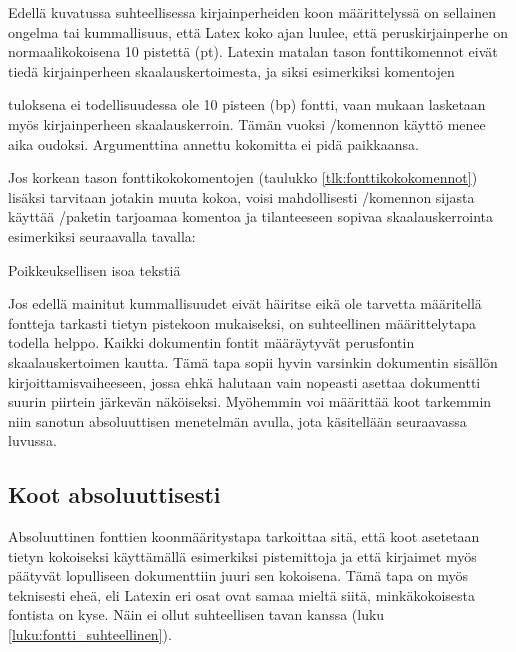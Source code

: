 Edellä kuvatussa suhteellisessa kirjainperheiden koon määrittelyssä on
sellainen ongelma tai kummallisuus, että Latex koko ajan luulee, että
peruskirjainperhe on normaalikokoisena 10 pistettä (pt). Latexin matalan
tason fonttikomennot eivät tiedä kirjainperheen skaalauskertoimesta, ja
siksi esimerkiksi komentojen

\begin{koodilohkosis}
  \fontsize{10bp}{12bp} \selectfont
\end{koodilohkosis}

tuloksena ei todellisuudessa ole 10 pisteen (bp) fontti, vaan mukaan
lasketaan myös kirjainperheen skaalauskerroin. Tämän vuoksi \-/komennon käyttö menee aika oudoksi. Argumenttina annettu
kokomitta ei pidä paikkaansa.

Jos korkean tason font\-ti\-koko\-komen\-to\-jen (taulukko
\ref{tlk:fonttikokokomennot}) lisäksi tarvitaan jotakin muuta kokoa,
voisi mahdollisesti \-/komennon sijasta käyttää
\-/paketin tarjoamaa komentoa ja tilanteeseen sopivaa
skaalauskerrointa esimerkiksi seuraavalla tavalla:

\begin{koodilohkosis}
  {Poikkeuksellisen isoa tekstiä}
\end{koodilohkosis}

Jos edellä mainitut kummallisuudet eivät häiritse eikä ole tarvetta
määritellä fontteja tarkasti tietyn pistekoon mukaiseksi, on
suhteellinen määrittelytapa todella helppo. Kaikki dokumentin fontit
määräytyvät perusfontin skaalauskertoimen kautta. Tämä tapa sopii hyvin
varsinkin dokumentin sisällön kirjoittamisvaiheeseen, jossa ehkä
halutaan vain nopeasti asettaa dokumentti suurin piirtein järkevän
näköiseksi. Myöhemmin voi määrittää koot tarkemmin niin sanotun
absoluuttisen menetelmän avulla, jota käsitellään seuraavassa luvussa.

\subsection{Koot absoluuttisesti}
\label{luku:fontti_absoluuttinen}

Absoluuttinen fonttien koonmääritystapa tarkoittaa sitä, että koot
asetetaan tietyn kokoiseksi käyttämällä esimerkiksi pistemittoja ja että
kirjaimet myös päätyvät lopulliseen dokumenttiin juuri sen kokoisena.
Tämä tapa on myös teknisesti eheä, eli Latexin eri osat ovat samaa
mieltä siitä, minkäkokoisesta fontista on kyse. Näin ei ollut
suhteellisen tavan kanssa (luku \ref{luku:fontti_suhteellinen}).


